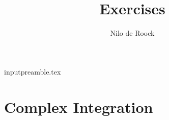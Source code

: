 input{preamble.tex}

%
\newcommand{\answerBox}[1]{
\begin{tcolorbox}[width=\textwidth,
title={Answer:},colbacktitle=white,coltitle=black]
    #1
\end{tcolorbox}
}
%
\title{Exercises}
\author{Nilo de Roock}
\date{\Date}


    \maketitle

    \tableofcontents{}

    \newpage
    \thispagestyle{empty}
    \chapter{Complex Integration}







